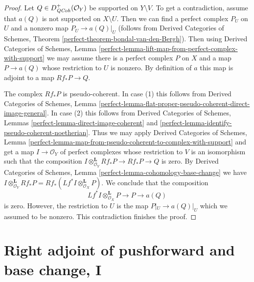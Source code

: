 \begin{proof}
Let $Q \in D^+_{\mathit{QCoh}}(\mathcal{O}_Y)$ be supported on $Y \setminus V$.
To get a contradiction, assume that $a(Q)$ is not supported on
$X \setminus U$. Then we can find a perfect complex $P_U$ on $U$
and a nonzero map $P_U \to a(Q)|_U$ (follows from
Derived Categories of Schemes, Theorem
\ref{perfect-theorem-bondal-van-den-Bergh}). Then using
Derived Categories of Schemes, Lemma
\ref{perfect-lemma-lift-map-from-perfect-complex-with-support}
we may assume there is a perfect complex $P$ on $X$ and a map
$P \to a(Q)$ whose restriction to $U$ is nonzero.
By definition of $a$ this map
is adjoint to a map $Rf_*P \to Q$.

\medskip\noindent
The complex $Rf_*P$ is pseudo-coherent. In case (1) this follows
from Derived Categories of Schemes, Lemma
\ref{perfect-lemma-flat-proper-pseudo-coherent-direct-image-general}.
In case (2) this follows from
Derived Categories of Schemes, Lemmas
\ref{perfect-lemma-direct-image-coherent} and
\ref{perfect-lemma-identify-pseudo-coherent-noetherian}.
Thus we may apply
Derived Categories of Schemes, Lemma
\ref{perfect-lemma-map-from-pseudo-coherent-to-complex-with-support}
and get a map $I \to \mathcal{O}_Y$ of perfect complexes
whose restriction to $V$ is an isomorphism such that the composition
$I \otimes^\mathbf{L}_{\mathcal{O}_Y} Rf_*P \to Rf_*P \to Q$ is zero.
By Derived Categories of Schemes, Lemma
\ref{perfect-lemma-cohomology-base-change}
we have $I \otimes^\mathbf{L}_{\mathcal{O}_Y} Rf_*P =
Rf_*(Lf^*I \otimes^\mathbf{L}_{\mathcal{O}_X} P)$.
We conclude that the composition
$$
Lf^*I \otimes^\mathbf{L}_{\mathcal{O}_X} P \to P \to a(Q)
$$
is zero. However, the restriction to $U$ is the map
$P|_U \to a(Q)|_U$ which we assumed to be nonzero.
This contradiction finishes the proof.
\end{proof}












\section{Right adjoint of pushforward and base change, I}
\label{section-base-change-map}


